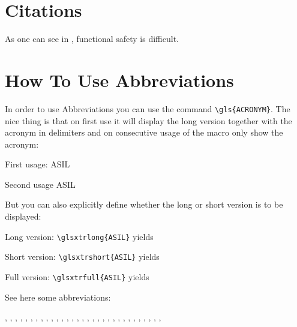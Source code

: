 \clearpage

\section{Citations}
\label{sec: Citations}

As one can see in \cite{iso_13849_part1}, functional safety is difficult.


\nocite{iso_13849_part1}
\nocite{iso_13849_part2}
\nocite{iso_12100}
\nocite{ISO:online}
\nocite{IEC:online}
\nocite{DIN:online}
\nocite{Isermann2010}
\nocite{francke2015internet}

\section{How To Use Abbreviations}

In order to use Abbreviations you can use the command \verb+\gls{ACRONYM}+.
The nice thing is that on first use it will display the long version together with the acronym in delimiters and on consecutive usage of the macro only show the acronym:

\begin{compactitem}
    \item First usage: \gls{ASIL}
    \item Second usage \gls{ASIL}
\end{compactitem}

But you can also explicitly define whether the long or short version is to be displayed:

\begin{compactitem}
    \item Long version: \verb+\glsxtrlong{ASIL}+ yields 
    \item Short version: \verb+\glsxtrshort{ASIL}+ yields 
    \item Full version: \verb+\glsxtrfull{ASIL}+ yields 
\end{compactitem}

See here some abbreviations:

,
,
,
,
,
,
,
,
,
,
,
,
,
,
,
,
,
,
,
,
,
,
,
,
,
,
,
,
,
,
,

